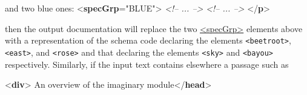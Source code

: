 \begin{shaded}
\hspace*{1em}\mbox{}\newline 
{} and two blue ones: {<\textbf{specGrp}\hspace*{1em}{xml:id}="{BLUE}">}\mbox{}\newline 
\hspace*{1em}\mbox{}\newline 
\textit{<!-- ... -->}\mbox{}\newline 
\hspace*{1em}\mbox{}\newline 
\hspace*{1em}\mbox{}\newline 
\textit{<!-- ... -->}\mbox{}\newline 
\hspace*{1em}\mbox{}\newline 
{}\mbox{}\newline 
{</\textbf{p}>}\end{shaded}\egroup\par \noindent  then the output documentation will replace the two \hyperref[TEI.specGrp]{<specGrp>} elements above with a representation of the schema code declaring the elements \texttt{<beetroot>}, \texttt{<east>}, and \texttt{<rose>} and that declaring the elements \texttt{<sky>} and \texttt{<bayou>} respectively. Similarly, if the input text contains elsewhere a passage such as \par\bgroup{}\exampleFont \begin{shaded}\noindent\mbox{}{<\textbf{div}>}\mbox{}\newline 
{}An overview of the imaginary module{</\textbf{head}>}\mbox{}\newline 

\end{shaded}
